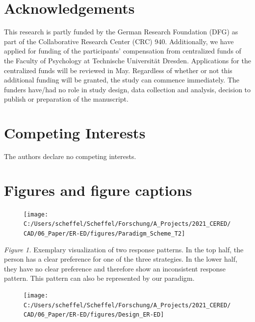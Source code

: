 \documentclass[
  english,
  man,floatsintext]{apa6}
\begin{document}
\endgroup

\newpage

\hypertarget{acknowledgements}{%
\section{Acknowledgements}\label{acknowledgements}}

This research is partly funded by the German Research Foundation (DFG) as part of the Collaborative Research Center (CRC) 940.
Additionally, we have applied for funding of the participants' compensation from centralized funds of the Faculty of Psychology at Technische Universität Dresden.
Applications for the centralized funds will be reviewed in May.
Regardless of whether or not this additional funding will be granted, the study can commence immediately.
The funders have/had no role in study design, data collection and analysis, decision to publish or preparation of the manuscript.

\hypertarget{competing-interests}{%
\section{Competing Interests}\label{competing-interests}}

The authors declare no competing interests.

\newpage
\setcounter{figure}{0}

\hypertarget{figures-and-figure-captions}{%
\section{Figures and figure captions}\label{figures-and-figure-captions}}

\newpage
\begin{figure}
\texttt{[image: C:/Users/scheffel/Scheffel/Forschung/A\_Projects/2021\_CERED/CAD/06\_Paper/ER-ED/figures/Paradigm\_Scheme\_T2]} \caption{ }\label{fig:ResponsePatternsAppendix}
\end{figure}

\emph{Figure 1.}
Exemplary visualization of two response patterns.
In the top half, the person has a clear preference for one of the three strategies.
In the lower half, they have no clear preference and therefore show an inconsistent response pattern.
This pattern can also be represented by our paradigm.

\begin{figure}[H]
\texttt{[image: C:/Users/scheffel/Scheffel/Forschung/A\_Projects/2021\_CERED/CAD/06\_Paper/ER-ED/figures/Design\_ER-ED]} \caption{ }\label{fig:DesignEREDappendix}
\end{figure}
\end{document}
